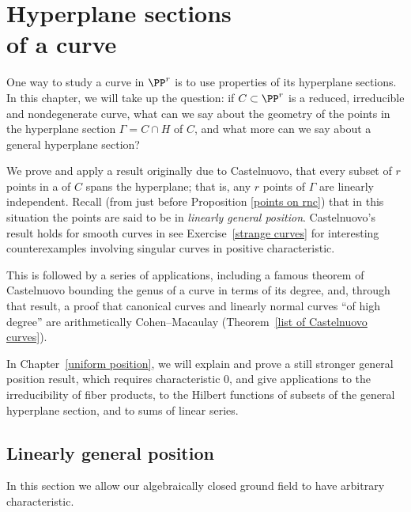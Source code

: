 


\chapter[Hyperplane sections of a curve]{Hyperplane sections\\of a curve}
\label{linear general position chapter}

One way to study a curve in $\PP^r$ is to use properties of its hyperplane
sections. In this chapter, we will take up the question: if $C \subset
\PP^r$ is a reduced, irreducible and nondegenerate curve, what can we say
about the geometry of the points in the  hyperplane section 
$\Gamma = C \cap H$ of $C$, and what more can we say about a general hyperplane
section?

We prove and apply a result originally due to Castelnuovo,
%
that every subset of $r$ points in a
%
of $C$ spans the hyperplane; that is, any $r$
points of $\Gamma$ are linearly independent. 
Recall (from just before Proposition \ref{points on rnc}) that
in this situation 
the points 
are said to be
in \emph{linearly general position}.
%
Castelnuovo's result
holds for smooth curves in 
%
see
Exercise~\ref{strange curves} for
interesting counterexamples involving singular curves in positive
characteristic. 

This is followed by a series of applications,
including 
a
%
famous theorem of Castelnuovo bounding the genus of a
curve in terms of its degree,
and, through that result, a proof that canonical curves and linearly
normal curves ``of high degree'' are arithmetically Cohen--Macaulay
%
(Theorem~\ref{list of Castelnuovo curves}).

{\footnotesize  %
In Chapter~\ref{uniform position}, we will explain and prove a still 
stronger general position result, which requires characteristic 0, and
give applications to the irreducibility of fiber products, to the Hilbert
functions of subsets of the
general hyperplane section, and to sums of linear series.

}

\section{Linearly general position}\label{linearly general position
section}
In this section we 
allow our algebraically closed ground field to
have arbitrary characteristic.

